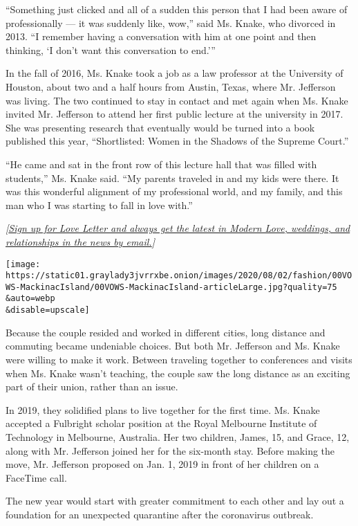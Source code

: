 ``Something just clicked and all of a sudden this person that I had been
aware of professionally --- it was suddenly like, wow,'' said Ms. Knake,
who divorced in 2013. ``I remember having a conversation with him at one
point and then thinking, `I don't want this conversation to end.'''

In the fall of 2016, Ms. Knake took a job as a law professor at the
University of Houston, about two and a half hours from Austin, Texas,
where Mr. Jefferson was living. The two continued to stay in contact and
met again when Ms. Knake invited Mr. Jefferson to attend her first
public lecture at the university in 2017. She was presenting research
that eventually would be turned into a book published this year,
``Shortlisted: Women in the Shadows of the Supreme Court.''

``He came and sat in the front row of this lecture hall that was filled
with students,'' Ms. Knake said. ``My parents traveled in and my kids
were there. It was this wonderful alignment of my professional world,
and my family, and this man who I was starting to fall in love with.''

\emph{{[}}\href{https://www.nytimes3xbfgragh.onion/newsletters/love-letter?module=inline}{\emph{Sign
up for Love Letter and always get the latest in Modern Love, weddings,
and relationships in the news by email.}}\emph{{]}}

\texttt{[image: https://static01.graylady3jvrrxbe.onion/images/2020/08/02/fashion/00VOWS-MackinacIsland/00VOWS-MackinacIsland-articleLarge.jpg?quality=75\\\&auto=webp\\\&disable=upscale]}

Because the couple resided and worked in different cities, long distance
and commuting became undeniable choices. But both Mr. Jefferson and Ms.
Knake were willing to make it work. Between traveling together to
conferences and visits when Ms. Knake wasn't teaching, the couple saw
the long distance as an exciting part of their union, rather than an
issue.

In 2019, they solidified plans to live together for the first time. Ms.
Knake accepted a Fulbright scholar position at the Royal Melbourne
Institute of Technology in Melbourne, Australia. Her two children,
James, 15, and Grace, 12, along with Mr. Jefferson joined her for the
six-month stay. Before making the move, Mr. Jefferson proposed on Jan.
1, 2019 in front of her children on a FaceTime call.

The new year would start with greater commitment to each other and lay
out a foundation for an unexpected quarantine after the coronavirus
outbreak.

